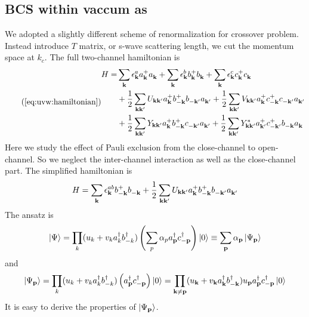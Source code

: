 \subsection{BCS within vaccum as \label{sec:20100908:cal}}
We adopted a slightly different scheme of renormalization for crossover problem.   Instead introduce $T$ matrix, or s-wave scattering length, we cut the momentum space at $k_{c}$.  The full two-channel hamiltonian is
\begin{equation}\tag{\ref{eq:uvw:hamiltonian}}
\begin{split}
 H=&\sum_\vk\epsilon^a_\vk{}a^+_\vk{}a^{}_\vk+\sum_\vk\epsilon^b_\vk{}b^+_\vk{}b^{}_\vk+\sum_\vk\epsilon^c_\vk{}c^+_\vk{}c^{}_\vk\\
  &+\nth{2}\sum_{\vk\vk'}U_{\vk\vk'}a^+_\vk{}b^+_{-\vk}{}b^{}_{-\vk'}a^{}_{\vk'}
	+\nth{2}\sum_{\vk\vk'}V_{\vk\vk'}a^+_\vk{}c^+_{-\vk}{}c^{}_{-\vk'}a^{}_{\vk'}\\
 &+\nth{2}\sum_{\vk\vk'}Y_{\vk\vk'}a^+_\vk{}b^+_{-\vk}{}c^{}_{-\vk'}a^{}_{\vk'}
	+\nth{2}\sum_{\vk\vk'}Y^*_{\vk\vk'}a^+_{\vk'}{}c^+_{-\vk'}{}b^{}_{-\vk}a^{}_{\vk}
\end{split} 
\end{equation}
Here we study the effect of Pauli exclusion from the close-channel to open-channel.  So we  neglect the inter-channel interaction as well as the close-channel part.  The simplified hamiltonian is 
\begin{equation}\label{eq:20100908:hamiltonian}
 H=\sum_{\mathbf{k}}\epsilon^{ab}_{\mathbf{k}}{}b^+_{-\mathbf{k}}{}b^{}_{-\mathbf{k}}+\frac{1}{2}\sum_{\mathbf{k}\mathbf{k}'}U_{\mathbf{k}\mathbf{k}'}a^+_{\mathbf{k}}{}b^+_{-\mathbf{k}}{}b^{}_{-\mathbf{k}'}a^{}_{\mathbf{k}'}
\end{equation}
  The ansatz is 
\begin{equation}
\left|\Psi\right>=\prod_{k}(u_{k}+v_{k}a^{\dagger}_{k}b^{\dagger}_{-k})\left(\sum_{p}{\alpha_{p}a^{\dagger}_{\mathbf{p}}c^{\dagger}_{-\mathbf{p}}}\right)\left|0\right>\equiv\sum_{\mathbf{p}}\alpha_{\mathbf{p}}\left|\Psi_{\mathbf{p}}\right>
\end{equation}
and 
\begin{equation}
\left|\Psi_{\mathbf{p}}\right>=\prod_{k}(u_{k}+v_{k}a^{\dagger}_{k}b^{\dagger}_{-k})\left(a^{\dagger}_{\mathbf{p}}c^{\dagger}_{-\mathbf{p}}\right)\left|0\right>
=\prod_{\mathbf{k}\neq{\ensuremath{\mathbf{p}}}}(u_{\mathbf{k}}+v_{\mathbf{k}}a^{\dagger}_{\mathbf{k}}b^{\dagger}_{-\mathbf{k}})u_{\mathbf{p}}a^{\dagger}_{\mathbf{p}}c^{\dagger}_{-\mathbf{p}}\left|0\right>
\end{equation}
It is easy to derive the properties of $\left|\Psi_{\mathbf{p}}\right>$. 
